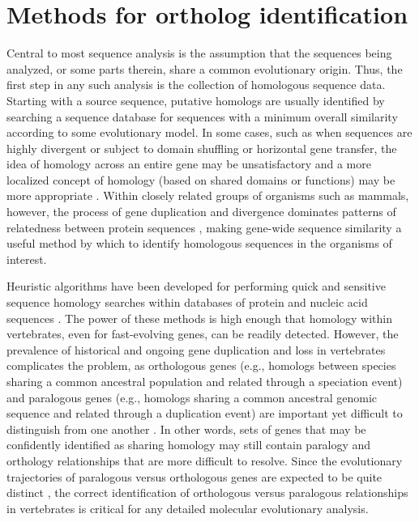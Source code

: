 
\section{Methods for ortholog identification}

Central to most sequence analysis is the assumption that the sequences
being analyzed, or some parts therein, share a common evolutionary
origin. Thus, the first step in any such analysis is the collection of
homologous sequence data. Starting with a source sequence, putative
homologs are usually identified by searching a sequence database for
sequences with a minimum overall similarity according to some
evolutionary model. In some cases, such as when sequences are highly
divergent or subject to domain shuffling or horizontal gene transfer,
the idea of homology across an entire gene may be unsatisfactory and a
more localized concept of homology (based on shared domains or
functions) may be more appropriate
\citep{Koonin2001,Sjolander2011}. Within closely related groups of
organisms such as mammals, however, the process of gene duplication
and divergence dominates patterns of relatedness between protein
sequences \citep{Ohno1970}, making gene-wide sequence similarity a
useful method by which to identify homologous sequences in the
organisms of interest.

Heuristic algorithms have been developed for performing quick and
sensitive sequence homology searches within databases of protein and
nucleic acid sequences \citep{Altschul1997,Eddy2009}. The power of
these methods is high enough that homology within vertebrates, even
for fast-evolving genes, can be readily detected. However, the
prevalence of historical and ongoing gene duplication and loss in
vertebrates complicates the problem, as orthologous genes (e.g.,
homologs between species sharing a common ancestral population and
related through a speciation event) and paralogous genes (e.g.,
homologs sharing a common ancestral genomic sequence and related
through a duplication event) are important yet difficult to
distinguish from one another \citep{Jun2009}. In other words, sets of
genes that may be confidently identified as sharing homology may still
contain paralogy and orthology relationships that are more difficult
to resolve. Since the evolutionary trajectories of paralogous versus
orthologous genes are expected to be quite distinct \citep{Lynch2000},
the correct identification of orthologous versus paralogous
relationships in vertebrates is critical for any detailed molecular
evolutionary analysis.

